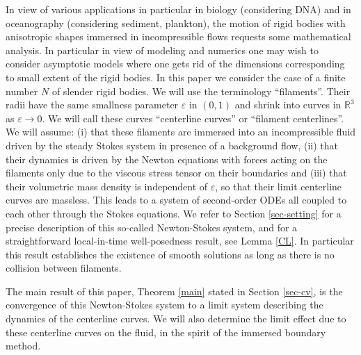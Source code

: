 \documentclass[10pt]{amsart}
\newcommand{\R}{\mathbb{R}}
\let\eps\varepsilon
\theoremstyle{definition}
\theoremstyle{remark}
\begin{document}
In view of various applications in particular in biology (considering DNA) and in oceanography (considering sediment, plankton), the motion of rigid bodies with aniso\-tropic shapes immersed in incompressible flows requests some mathematical analysis.
In particular in view of modeling and numerics one may wish to consider asymptotic models where one gets rid of the dimensions corresponding to small extent of the rigid bodies. In this paper we consider the case of a finite number $N$ of slender rigid bodies. We will use the terminology ``filaments''. Their radii have the same smallness parameter $\eps$ in $(0,1)$ and shrink into curves in $\R^3$ as $\eps \to 0$. We will call these curves ``centerline curves'' or ``filament centerlines''. We will assume: (i) that these filaments are immersed into an incompressible fluid driven by the steady Stokes system in presence of a background flow, (ii) that their dynamics is driven by the Newton equations with forces acting on the filaments only due to the viscous stress tensor on their boundaries and (iii) that their volumetric mass density is independent of $\eps$, so that their limit centerline curves are massless.
This leads to a system of second-order ODEs all coupled to each other through the Stokes equations. We refer to Section \ref{sec-setting} for a precise description of this so-called Newton-Stokes system,
and for a straightforward local-in-time well-posedness result, see Lemma \ref{CL}. In particular this result establishes the existence of smooth solutions as long as there is no collision between filaments.

The main result of this paper, Theorem \ref{main} stated in Section \ref{sec-cv}, is the convergence of this Newton-Stokes system to a limit system describing the dynamics of the centerline curves. We will also determine the limit effect due to these centerline curves on the fluid, in the spirit of the immersed boundary method.
\end{document}
